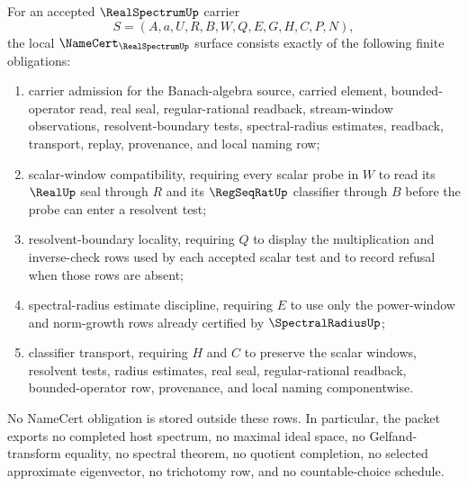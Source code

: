 \begin{theorem}
\label{thm:real-spectrum-namecert-obligations}
For an accepted $\RealSpectrumUp$ carrier
$$
S=(A,a,U,R,B,W,Q,E,G,H,C,P,N),
$$
the local $\NameCert_{\RealSpectrumUp}$ surface consists exactly of the following finite obligations:
\begin{enumerate}
\item carrier admission for the Banach-algebra source, carried element, bounded-operator read, real seal, regular-rational readback, stream-window observations, resolvent-boundary tests, spectral-radius estimates, readback, transport, replay, provenance, and local naming row;
\item scalar-window compatibility, requiring every scalar probe in $W$ to read its $\RealUp$ seal through $R$ and its $\RegSeqRatUp$ classifier through $B$ before the probe can enter a resolvent test;
\item resolvent-boundary locality, requiring $Q$ to display the multiplication and inverse-check rows used by each accepted scalar test and to record refusal when those rows are absent;
\item spectral-radius estimate discipline, requiring $E$ to use only the power-window and norm-growth rows already certified by $\SpectralRadiusUp$;
\item classifier transport, requiring $H$ and $C$ to preserve the scalar windows, resolvent tests, radius estimates, real seal, regular-rational readback, bounded-operator row, provenance, and local naming componentwise.
\end{enumerate}
No NameCert obligation is stored outside these rows. In particular, the packet exports no completed host spectrum, no maximal ideal space, no Gelfand-transform equality, no spectral theorem, no quotient completion, no selected approximate eigenvector, no trichotomy row, and no countable-choice schedule.
\end{theorem}
